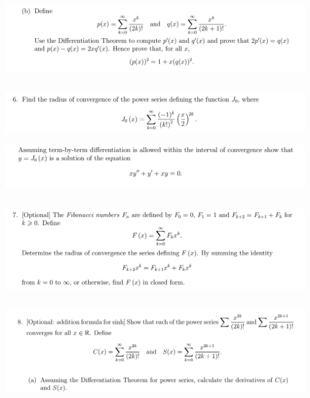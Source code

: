 \documentclass[12pt]{article}
\begin{document}
\begin{mdframed}
\includegraphics[width=400pt]{img/analysis--oxford-M2-I-7-5-b.png}
\end{mdframed}

\newpage
\subsection{}
\begin{mdframed}
\includegraphics[width=400pt]{img/analysis--oxford-M2-I-7-6-a.png}
\end{mdframed}

\begin{mdframed}
\includegraphics[width=400pt]{img/analysis--oxford-M2-I-7-6-b.png}
\end{mdframed}

\newpage
\subsection{}
\begin{mdframed}
\includegraphics[width=400pt]{img/analysis--oxford-M2-I-7-7.png}
\end{mdframed}

\newpage
\subsection{}
\begin{mdframed}
\includegraphics[width=400pt]{img/analysis--oxford-M2-I-7-8-a.png}
\end{mdframed}
\end{document}
